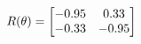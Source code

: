 \documentclass[preview]{standalone}
\begin{document}
\begin{align*}
\special{dvisvgm:raw <g id='unique000'>}R(\theta) = \begin{bmatrix}-0.95 & 0.33\\-0.33 & -0.95\end{bmatrix}\special{dvisvgm:raw </g>}
\end{align*}
\end{document}
